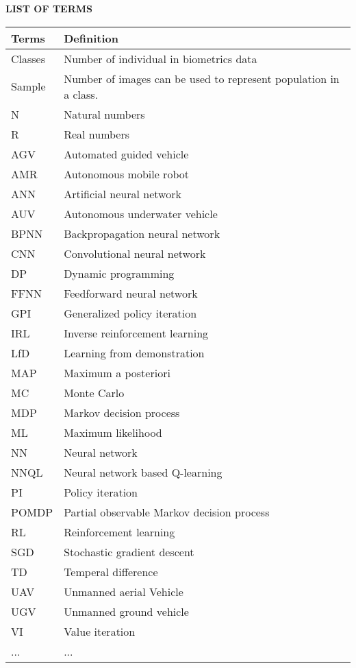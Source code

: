 \begin{center}  
\normalfont\LARGE\textbf{LIST OF TERMS}
\end{center}
\begin{longtable}{p{2.5cm} p{11.5cm}}
	\textbf{Terms} & \textbf{Definition}\\
	\hline \endhead
	Classes & Number of individual in biometrics data\\
	Sample & Number of images can be used to represent population in a class.\\
	
	N & Natural numbers \\
	R & Real numbers\\ 
	AGV & Automated guided vehicle \\
	AMR & Autonomous mobile robot \\
	ANN & Artificial neural network \\
	AUV & Autonomous underwater vehicle \\
	BPNN & Backpropagation neural network \\
	CNN & Convolutional neural network \\
	DP & Dynamic programming \\
	FFNN & Feedforward neural network \\
	GPI & Generalized policy iteration \\
	IRL & Inverse reinforcement learning \\
	LfD & Learning from demonstration \\
	MAP & Maximum a posteriori \\
	MC & Monte Carlo \\
	MDP & Markov decision process \\
	ML & Maximum likelihood \\
	NN & Neural network \\
	NNQL & Neural network based Q-learning \\
	PI & Policy iteration \\
	POMDP & Partial observable Markov decision process \\
	RL & Reinforcement learning \\
	SGD & Stochastic gradient descent \\
	TD & Temperal difference \\
	UAV & Unmanned aerial Vehicle \\
	UGV & Unmanned ground vehicle \\
	VI & Value iteration \\
	... & ...\\
\end{longtable}


